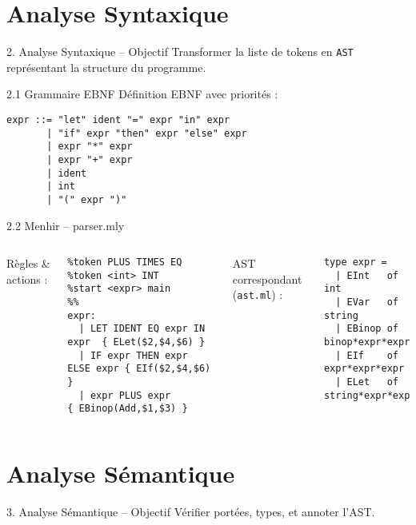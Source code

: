 \documentclass[aspectratio=43]{beamer}
\begin{document}
\section{Analyse Syntaxique}
\begin{frame}{2. Analyse Syntaxique – Objectif}
Transformer la liste de tokens en \texttt{AST} représentant la structure du programme.
\end{frame}

\begin{frame}[fragile]{2.1 Grammaire EBNF}
Définition EBNF avec priorités :
\begin{lstlisting}[style=ebnf]
expr ::= "let" ident "=" expr "in" expr
       | "if" expr "then" expr "else" expr
       | expr "*" expr
       | expr "+" expr
       | ident
       | int
       | "(" expr ")"
\end{lstlisting}
\end{frame}

\begin{frame}[fragile]{2.2 Menhir – parser.mly}
\begin{columns}
Règles \& actions :
\begin{lstlisting}[style=ocaml]
%token LET IN IF THEN ELSE
%token PLUS TIMES EQ
%token <int> INT
%start <expr> main
%%
expr:
  | LET IDENT EQ expr IN expr  { ELet($2,$4,$6) }
  | IF expr THEN expr ELSE expr { EIf($2,$4,$6) }
  | expr PLUS expr             { EBinop(Add,$1,$3) }
\end{lstlisting}
AST correspondant (\texttt{ast.ml}) :
\begin{lstlisting}[style=ocaml]
type expr =
  | EInt   of int
  | EVar   of string
  | EBinop of binop*expr*expr
  | EIf    of expr*expr*expr
  | ELet   of string*expr*expr
\end{lstlisting}
\end{columns}
\end{frame}

\section{Analyse Sémantique}
\begin{frame}{3. Analyse Sémantique – Objectif}
Vérifier portées, types, et annoter l'AST.
\end{frame}
\end{document}
